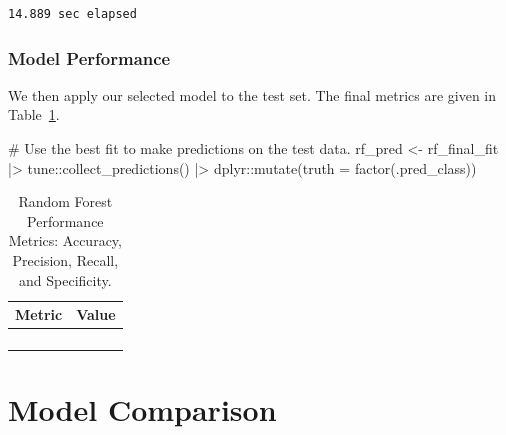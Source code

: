 \documentclass[
  letterpaper,
  DIV=11,
  numbers=noendperiod]{scrartcl}
\newenvironment{Shaded}{\begin{snugshade}}{\end{snugshade}}
\newcommand{\AttributeTok}[1]{\textcolor[rgb]{0.40,0.45,0.13}{#1}}
\newcommand{\CommentTok}[1]{\textcolor[rgb]{0.37,0.37,0.37}{#1}}
\newcommand{\FunctionTok}[1]{\textcolor[rgb]{0.28,0.35,0.67}{#1}}
\newcommand{\NormalTok}[1]{\textcolor[rgb]{0.00,0.23,0.31}{#1}}
\newcommand{\OtherTok}[1]{\textcolor[rgb]{0.00,0.23,0.31}{#1}}
\newcommand{\SpecialCharTok}[1]{\textcolor[rgb]{0.37,0.37,0.37}{#1}}
\begin{document}
\begin{verbatim}
14.889 sec elapsed
\end{verbatim}

\subsubsection{Model Performance}\label{model-performance-5}

We then apply our selected model to the test set. The final metrics are
given in Table~\ref{tbl-rf-performance}.

\begin{Shaded}
\begin{Highlighting}[]
\CommentTok{\# Use the best fit to make predictions on the test data.}
\NormalTok{rf\_pred }\OtherTok{\textless{}{-}} 
\NormalTok{  rf\_final\_fit }\SpecialCharTok{|\textgreater{}} 
\NormalTok{  tune}\SpecialCharTok{::}\FunctionTok{collect\_predictions}\NormalTok{() }\SpecialCharTok{|\textgreater{}}
\NormalTok{  dplyr}\SpecialCharTok{::}\FunctionTok{mutate}\NormalTok{(}\AttributeTok{truth =} \FunctionTok{factor}\NormalTok{(.pred\_class))}
\end{Highlighting}
\end{Shaded}

\begin{longtable}{>{\raggedright\arraybackslash}p{}>{\raggedleft\arraybackslash}p{}}

\caption{\label{tbl-rf-performance}Random Forest Performance Metrics:
Accuracy, Precision, Recall, and Specificity.}

\tabularnewline

\toprule
Metric & Value \\ 
\midrule\addlinespace[2.5pt]
\cellcolor[HTML]{FFFFFF}{Accuracy} & \cellcolor[HTML]{FFFFFF}{94.5} \\ 
\cellcolor[HTML]{FFFFFF}{Precision} & \cellcolor[HTML]{FFFFFF}{84.6} \\ 
\cellcolor[HTML]{FFFFFF}{Recall} & \cellcolor[HTML]{FFFFFF}{95.7} \\ 
\cellcolor[HTML]{FFFFFF}{Specificity} & \cellcolor[HTML]{FFFFFF}{94.1} \\ 
\bottomrule

\end{longtable}

\section{Model Comparison}\label{model-comparison}
\end{document}

